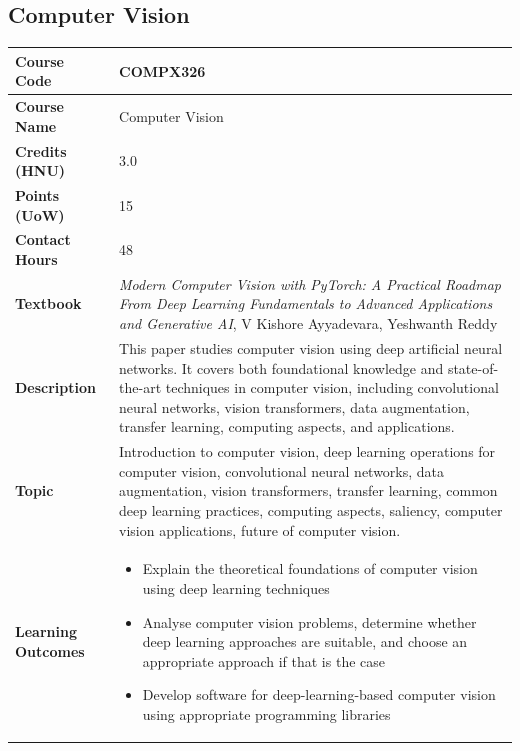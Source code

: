 \documentclass{article}
\begin{document}
\subsection[COMPX326 Computer Vision]{Computer Vision}
\renewcommand{\arraystretch}{1.5} %
\begin{longtable}{|p{3cm}|p{10cm}|}
\hline
\textbf{Course Code} & COMPX326 \\
\hline
\textbf{Course Name} & Computer Vision \\
\hline
\textbf{Credits (HNU)} & 3.0 \\
\hline
\textbf{Points (UoW)} & 15 \\
\hline
\textbf{Contact Hours} & 48 \\
\hline
\textbf{Textbook} & \emph{Modern Computer Vision with PyTorch: A Practical Roadmap From Deep Learning Fundamentals to Advanced Applications and Generative AI}, V Kishore Ayyadevara, Yeshwanth Reddy \\
\hline
\textbf{Description} & This paper studies computer vision using deep artificial neural networks. It covers both foundational knowledge and state-of-the-art techniques in computer vision, including convolutional neural networks, vision transformers, data augmentation, transfer learning, computing aspects, and applications.\\
\hline
\textbf{Topic} & Introduction to computer vision, 
deep learning operations for computer vision, 
convolutional neural networks, 
data augmentation, 
vision transformers, 
transfer learning, 
common deep learning practices, 
computing aspects, 
saliency, 
computer vision applications, 
future of computer vision.\\
\hline
\textbf{Learning Outcomes} & 
    \begin{itemize}
        \item Explain the theoretical foundations of computer vision using deep learning techniques
        \item Analyse computer vision problems, determine whether deep learning approaches are suitable, and choose an appropriate approach if that is the case
        \item Develop software for deep-learning-based computer vision using appropriate programming libraries
    \end{itemize} \\
\hline
\end{longtable}
\end{document}
